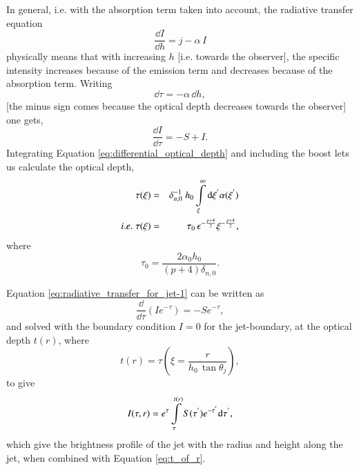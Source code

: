 In general, i.e. with the absorption term taken into account, the radiative transfer equation
\begin{equation}
\dfrac{\dd I}{\dd h} = j - \alpha \, I
\label{eq:full_radiative_transfer_jet}
\end{equation}
physically means that with increasing $h$ [i.e. towards the observer], the specific intensity increases because of the emission term and decreases because of the absorption term. Writing
\begin{equation}
\dd \tau = - \alpha \, \dd h,
\label{eq:differential_optical_depth}
\end{equation}
[the minus sign comes because the optical depth decreases towards the observer]
one gets,
\begin{equation}
\dfrac{\dd I}{\dd \tau} = - S + I.
\label{eq:radiative_transfer_for_jet-1}
\end{equation}
Integrating Equation \ref{eq:differential_optical_depth} and including the boost lets us calculate the optical depth,
\begin{eqnarray}
\tau( \xi ) & = & \delta_{n,0}^{-1} \; h_0 \intop_{\xi}^{\infty} \dd \xi^{'} \alpha(\xi^{'}) \nonumber \\
i.e. \; \tau( \xi ) & = & \tau_0 \, \epsilon^{- \frac{p+4}{2} } \xi^{- \frac{p+4}{2} } ,
\label{eq:tau_on_axis}
\end{eqnarray}
where
\begin{equation}
\tau_0 = \dfrac{2 \alpha_0 h_0 }{(p+4) \delta_{n,0}}.
\label{eq:tau_zero}
\end{equation}

Equation \ref{eq:radiative_transfer_for_jet-1} can be written as
\begin{equation}
\dfrac{\dd}{\dd \tau}(I e^{- \tau}) = - S e^{- \tau},
\label{eq:radiative_transfer_equation_for_jet-2}
\end{equation}
and solved with the boundary condition $I = 0$ for the jet-boundary, at the optical depth $t(r)$, where
\begin{equation}
t(r) = \tau( \xi = \dfrac{r}{h_0 \, \tan \theta_j } ),
\label{eq:t_of_r}
\end{equation} 
to give
\begin{equation}
I(\tau, r) = e^{\tau} \intop_{\tau}^{t(r)} S(\tau^{'}) e^{- \tau^{'}} \dd \tau^{'},
\label{eq:brightness_profile_of_jet}
\end{equation}
which give the brightness profile of the jet with the radius and height along the jet, when combined with Equation \ref{eq:t_of_r}.

